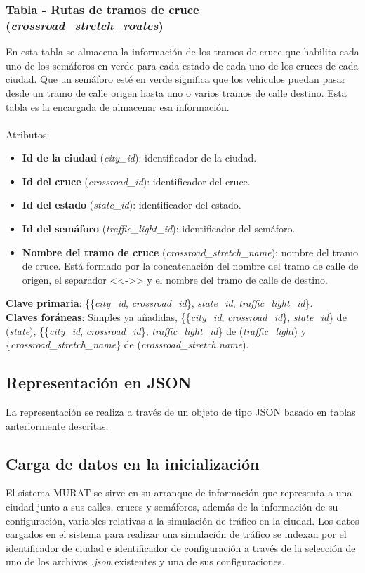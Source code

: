 \subsubsection{Tabla - Rutas de tramos de cruce (\textit{crossroad\_stretch\_routes})}
En esta tabla se almacena la información de los tramos de cruce que habilita cada uno de los semáforos en verde para cada estado de cada uno de los cruces de cada ciudad. Que un semáforo esté en verde significa que los vehículos puedan pasar desde un tramo de calle origen hasta uno o varios tramos de calle destino. Esta tabla es la encargada de almacenar esa información. \\\\
Atributos:
\begin{itemize}
    \item \textbf{Id de la ciudad} (\textit{city\_id}): identificador de la ciudad.
    \item \textbf{Id del cruce} (\textit{crossroad\_id}): identificador del cruce.
    \item \textbf{Id del estado} (\textit{state\_id}): identificador del estado.
    \item \textbf{Id del semáforo} (\textit{traffic\_light\_id}): identificador del semáforo.
    \item \textbf{Nombre del tramo de cruce} (\textit{crossroad\_stretch\_name}): nombre del tramo de cruce. Está formado por la concatenación del nombre del tramo de calle de origen, el separador <<->> y el nombre del tramo de calle de destino.
\end{itemize}
\textbf{Clave primaria}: \{\{\textit{city\_id}, \textit{crossroad\_id}\}, \textit{state\_id}, \textit{traffic\_light\_id}\}. \\
\textbf{Claves foráneas}: Simples ya añadidas, \{\{\textit{city\_id}, \textit{crossroad\_id}\}, \textit{state\_id}\} de (\textit{state}), \{\{\textit{city\_id}, \textit{crossroad\_id}\}, \textit{traffic\_light\_id}\} de (\textit{traffic\_light}) y \newline \{\textit{crossroad\_stretch\_name}\} de (\textit{crossroad\_stretch.name}).

\subsection{Representación en JSON}
La representación se realiza a través de un objeto de tipo JSON basado en tablas anteriormente descritas.

\subsection{Carga de datos en la inicialización}
El sistema MURAT se sirve en su arranque de información que representa a una ciudad junto a sus calles, cruces y semáforos, además de la información de su configuración, variables relativas a la simulación de tráfico en la ciudad. Los datos cargados en el sistema para realizar una simulación de tráfico se indexan por el identificador de ciudad e identificador de configuración a través de la selección de uno de los archivos \textit{.json} existentes y una de sus configuraciones.

